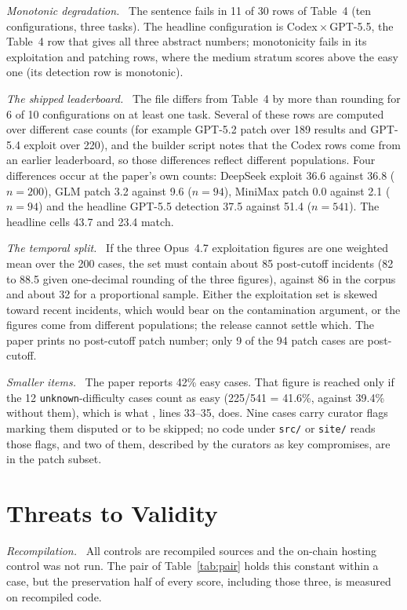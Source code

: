 \documentclass[conference]{IEEEtran}
\newcommand{\code}[1]{\texttt{#1}}
\newcommand{\para}[1]{\textit{#1.}\ }
\begin{document}
\para{Monotonic degradation} The sentence fails in 11 of 30 rows of Table~4 (ten configurations, three tasks). The headline configuration is Codex\,$\times$\,GPT-5.5, the Table~4 row that gives all three abstract numbers; monotonicity fails in its exploitation and patching rows, where the medium stratum scores above the easy one (its detection row is monotonic).

\para{The shipped leaderboard} The file  differs from Table~4 by more than rounding for 6 of 10 configurations on at least one task. Several of these rows are computed over different case counts (for example GPT-5.2 patch over 189 results and GPT-5.4 exploit over 220), and the builder script notes that the Codex rows come from an earlier leaderboard, so those differences reflect different populations. Four differences occur at the paper's own counts: DeepSeek exploit 36.6 against 36.8 ($n=200$), GLM patch 3.2 against 9.6 ($n=94$), MiniMax patch 0.0 against 2.1 ($n=94$) and the headline GPT-5.5 detection 37.5 against 51.4 ($n=541$). The headline cells 43.7 and 23.4 match.

\para{The temporal split} If the three Opus~4.7 exploitation figures are one weighted mean over the 200 cases, the set must contain about 85 post-cutoff incidents (82 to 88.5 given one-decimal rounding of the three figures), against 86 in the corpus and about 32 for a proportional sample. Either the exploitation set is skewed toward recent incidents, which would bear on the contamination argument, or the figures come from different populations; the release cannot settle which. The paper prints no post-cutoff patch number; only 9 of the 94 patch cases are post-cutoff.

\para{Smaller items} The paper reports 42\% easy cases. That figure is reached only if the 12 \code{unknown}-difficulty cases count as easy (225/541 = 41.6\%, against 39.4\% without them), which is what , lines 33--35, does. Nine cases carry curator flags marking them disputed or to be skipped; no code under \code{src/} or \code{site/} reads those flags, and two of them, described by the curators as key compromises, are in the patch subset.

\section{Threats to Validity}
\label{sec:threats}
\para{Recompilation} All controls are recompiled sources and the on-chain hosting control was not run. The pair of Table~\ref{tab:pair} holds this constant within a case, but the preservation half of every score, including those three, is measured on recompiled code.
\end{document}
